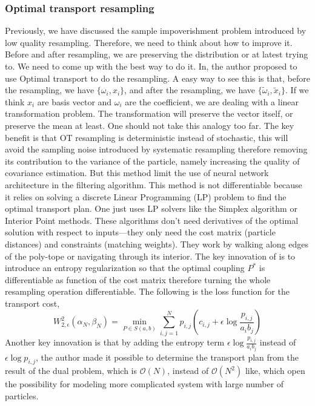 \documentclass{article}
\begin{document}
  



\subsubsection{Optimal transport resampling}
Previously, we have discussed the sample impoverishment problem introduced by low quality resampling. Therefore, we need to think about how to improve it. Before and after resampling, we are preserving the distribution or at latest trying to. We need to come up with the best way to do it. In\cite{reich2013nonparametric}, the author proposed to use Optimal transport to do the resampling. A easy way to see this is that, before the resampling, we have $\{\omega_i, x_i\}$, and after the resampling, we have $\{\tilde\omega_i, \tilde x_i\}$. If we think $x_i$ are basis vector and $\omega_i$ are the coefficient, we are dealing with a linear transformation problem. The transformation will preserve the vector itself, or preserve the mean at least. One should not take this analogy too far. The key benefit is that OT resampling is deterministic instead of stochastic, this will avoid the sampling noise introduced by systematic resampling therefore removing its contribution to the variance of the particle, namely increasing the quality of covariance estimation. But this method limit the use of neural network architecture in the filtering algorithm. This method is not differentiable because it relies on solving a discrete Linear Programming (LP) problem to find the optimal transport plan. One just uses LP solvers like the Simplex algorithm or Interior Point methods. These algorithms don't need derivatives of the optimal solution with respect to inputs—they only need the cost matrix (particle distances) and constraints (matching weights). They work by walking along edges of the poly-tope or navigating through its interior. The key innovation of \cite{corenflos-differentiable-2021} is to introduce an entropy regularization so that the optimal coupling $P^*$ is differentiable as function of the cost matrix therefore turning the whole resampling operation differentiable. The following is the loss function for the  transport cost,
\begin{equation}
    W_{2, \epsilon}^2 (\alpha_N, \beta_N) = \min_{P \in S(a, b)} \sum_{i,j=1}^N p_{i,j} \left( c_{i,j} + \epsilon \log \frac{p_{i,j}}{a_i b_j} \right)
\end{equation}
Another key innovation is that by adding the entropy term $\epsilon \log \frac{p_{i,j}}{a_i b_j}$ instead of $\epsilon \log p_{i,j}$, the author made it possible to determine the transport plan from the result of the dual problem, which is $\mathcal{O}(N)$, instead of $\mathcal{O}(N^2)$ like\cite{reich2013nonparametric}, which open the possibility for modeling more complicated system with large number of particles.
\end{document}
